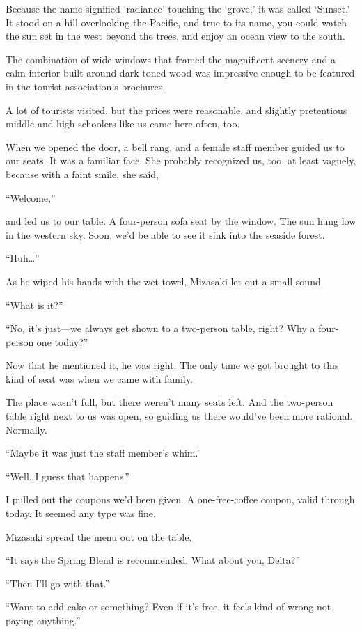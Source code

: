 \documentclass[
    a4paper,
    12pt,
    twoside,
    openany,
    UTF8,
    fontset=windows
]{ctexbook}
\begin{document}
Because the name signified `radiance' touching the `grove,' it was called `Sunset.' It stood on a hill overlooking the Pacific, and true to its name, you could watch the sun set in the west beyond the trees, and enjoy an ocean view to the south.

The combination of wide windows that framed the magnificent scenery and a calm interior built around dark-toned wood was impressive enough to be featured in the tourist association's brochures.

A lot of tourists visited, but the prices were reasonable, and slightly pretentious middle and high schoolers like us came here often, too.

When we opened the door, a bell rang, and a female staff member guided us to our seats. It was a familiar face. She probably recognized us, too, at least vaguely, because with a faint smile, she said,

``Welcome,''

and led us to our table. A four-person sofa seat by the window. The sun hung low in the western sky. Soon, we'd be able to see it sink into the seaside forest.

``Huh\dots''

As he wiped his hands with the wet towel, Mizasaki let out a small sound.

``What is it?''

``No, it's just---we always get shown to a two-person table, right? Why a four-person one today?''

Now that he mentioned it, he was right. The only time we got brought to this kind of seat was when we came with family.

The place wasn't full, but there weren't many seats left. And the two-person table right next to us was open, so guiding us there would've been more rational. Normally.

``Maybe it was just the staff member's whim.''

``Well, I guess that happens.''

I pulled out the coupons we'd been given. A one-free-coffee coupon, valid through today. It seemed any type was fine.

Mizasaki spread the menu out on the table.

``It says the Spring Blend is recommended. What about you, Delta?''

``Then I'll go with that.''

``Want to add cake or something? Even if it's free, it feels kind of wrong not paying anything.''
\end{document}
